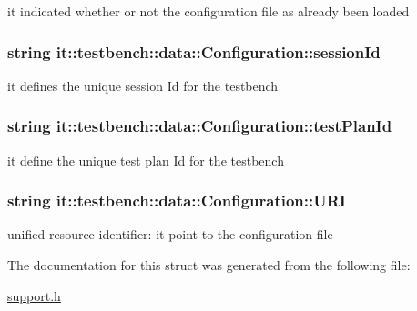 it indicated whether or not the configuration file as already been loaded \hypertarget{structit_1_1testbench_1_1data_1_1Configuration_acfae4c3c17704d6b7dd811e9cfae1936}{
\subsubsection[{session\-Id}]{\setlength{\rightskip}{0pt plus 5cm}string it\-::testbench\-::data\-::\-Configuration\-::session\-Id}}\label{d1/d49/structit_1_1testbench_1_1data_1_1Configuration_acfae4c3c17704d6b7dd811e9cfae1936}
it defines the unique session Id for the testbench \hypertarget{structit_1_1testbench_1_1data_1_1Configuration_a68d050a0e0201f20175b6ba1433c0d11}{
\subsubsection[{test\-Plan\-Id}]{\setlength{\rightskip}{0pt plus 5cm}string it\-::testbench\-::data\-::\-Configuration\-::test\-Plan\-Id}}\label{d1/d49/structit_1_1testbench_1_1data_1_1Configuration_a68d050a0e0201f20175b6ba1433c0d11}
it define the unique test plan Id for the testbench \hypertarget{structit_1_1testbench_1_1data_1_1Configuration_a398b2a31ac8b59a3ff53038504bd1717}{
\subsubsection[{U\-R\-I}]{\setlength{\rightskip}{0pt plus 5cm}string it\-::testbench\-::data\-::\-Configuration\-::\-U\-R\-I}}\label{d1/d49/structit_1_1testbench_1_1data_1_1Configuration_a398b2a31ac8b59a3ff53038504bd1717}
unified resource identifier\-: it point to the configuration file 

The documentation for this struct was generated from the following file\-:\begin{DoxyCompactItemize}
\item 
\hyperlink{support_8h}{support.\-h}\end{DoxyCompactItemize}
